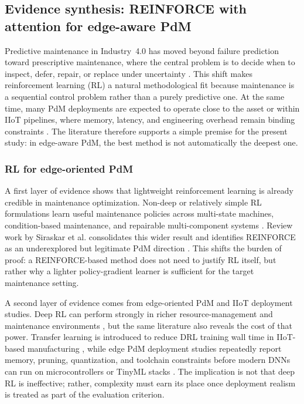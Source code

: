 \documentclass[refree,sn-basic]{sn-jnl} %
\begin{document}
\subsection{Evidence synthesis: REINFORCE with attention for edge-aware PdM}
\label{sec:reinforce_attention_pdm}

Predictive maintenance in Industry~4.0 has moved beyond failure prediction toward prescriptive maintenance, where the central problem is to decide when to inspect, defer, repair, or replace under uncertainty \cite{Compare2020, Ansari2019, Siraskar2023, Zhang2024}. This shift makes reinforcement learning (RL) a natural methodological fit because maintenance is a sequential control problem rather than a purely predictive one. At the same time, many PdM deployments are expected to operate close to the asset or within IIoT pipelines, where memory, latency, and engineering overhead remain binding constraints \cite{Compare2020, Pandey2023, Njor2024}. The literature therefore supports a simple premise for the present study: in edge-aware PdM, the best method is not automatically the deepest one.

\subsubsection{RL for edge-oriented PdM}
A first layer of evidence shows that lightweight reinforcement learning is already credible in maintenance optimization. Non-deep or relatively simple RL formulations learn useful maintenance policies across multi-state machines, condition-based maintenance, and repairable multi-component systems \cite{Wang2014, Adsule2020, Yousefi2020}. Review work by Siraskar et al. consolidates this wider result and identifies REINFORCE as an underexplored but legitimate PdM direction \cite{Siraskar2023}. This shifts the burden of proof: a REINFORCE-based method does not need to justify RL itself, but rather why a lighter policy-gradient learner is sufficient for the target maintenance setting.

A second layer of evidence comes from edge-oriented PdM and IIoT deployment studies. Deep RL can perform strongly in richer resource-management and maintenance environments \cite{Ong2022-01, Ong2022-02}, but the same literature also reveals the cost of that power. Transfer learning is introduced to reduce DRL training wall time in IIoT-based manufacturing \cite{Ong2022-02}, while edge PdM deployment studies repeatedly report memory, pruning, quantization, and toolchain constraints before modern DNNs can run on microcontrollers or TinyML stacks \cite{Pandey2023, Njor2024}. The implication is not that deep RL is ineffective; rather, complexity must earn its place once deployment realism is treated as part of the evaluation criterion.
\end{document}
